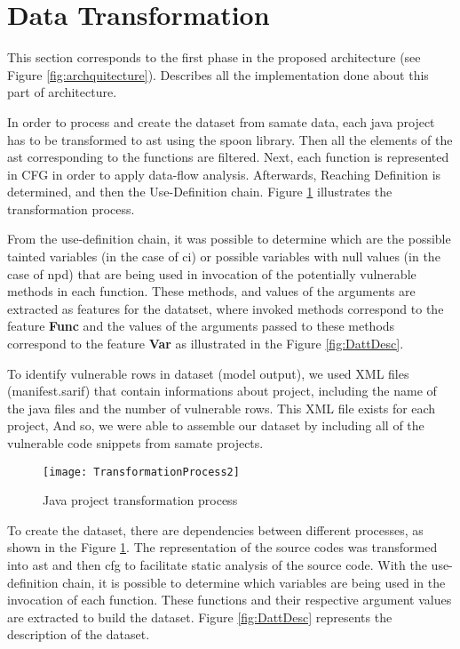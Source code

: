 \section{Data Transformation} %
\label{sec:	Data_Tranformation}

This section corresponds to the first phase in the proposed architecture  (see Figure \ref{fig:archquitecture}). Describes all the implementation done about this part of architecture.

In order to process and create the dataset from \gls{samate} data, each java project has to be transformed to \gls{ast} using the spoon library. Then all the elements of the \gls{ast} corresponding to the functions are filtered. Next, each function is represented in CFG in order to apply data-flow analysis. Afterwards, Reaching Definition is determined, and then the Use-Definition chain. Figure \ref{fig:transfProcess} illustrates the transformation process.

From the use-definition chain, it was possible to determine which are the possible tainted variables (in the case of \gls{ci}) or possible variables with null values (in the case of \gls{npd}) that are being used in invocation of the potentially vulnerable methods in each function. These methods, and values of the arguments are extracted as features for the datatset, where invoked methods correspond to the feature \textbf{Func} and the values of the arguments passed to these methods correspond to the feature \textbf{Var} as illustrated in the Figure \ref{fig:DattDesc}.

To identify vulnerable rows in dataset (model output), we used XML files (manifest.sarif) that contain informations about project, including the name of the java files and the number of vulnerable rows. This XML file exists for each project, And so, we were able to assemble our dataset by including all of the vulnerable code snippets from \gls{samate} projects.

\newpage

\begin{figure}[ht]
	\centering
	\texttt{[image: TransformationProcess2]}
	  \caption{Java project transformation process}
  \label{fig:transfProcess}
\end{figure}

To create the dataset, there are dependencies between different processes, as shown in the Figure \ref{fig:transfProcess}. The representation of the source codes was transformed into \gls{ast} and then \gls{cfg} to facilitate static analysis of the source code. With the use-definition chain, it is possible to determine which variables are being used in the invocation of each function. These functions and their respective argument values are extracted to build the dataset. Figure \ref{fig:DattDesc} represents the description of the dataset.

